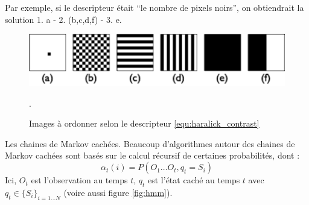\documentclass[11pt,addpoints]{exam}
\begin{document}
\begin{questions}
\begin{parts}
Par exemple, si le descripteur était ``le nombre de pixels noirs'', on
obtiendrait la solution 1. a - 2. (b,c,d,f) - 3. e. 
\end{parts}

\begin{figure}[!ht]
\centering
\includegraphics[scale=0.8]{Haralick_question.pdf}
\caption{Images à ordonner selon le descripteur
  \ref{equ:haralick_contrast} }. 
\label{fig:haralick}
\end{figure}


\question[4] Les chaines de Markov cachées. 
Beaucoup d'algorithmes autour des chaines de Markov cachées sont basés
sur le calcul récursif de certaines probabilités, dont : 
\begin{equation}\label{equ:alpha}
\alpha_t(i) = P(O_1\ldots O_t, q_t=S_i) 
\end{equation}
Ici, $O_t$ est l'observation au temps $t$, $q_t$ est l'état caché au
temps $t$ avec $q_t \in \{S_i\}_{i=1 \ldots N}$ (voire aussi figure
\ref{fig:hmm}).



\end{questions}
\end{document}
